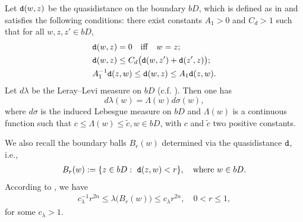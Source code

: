 \documentclass[11pt,a4paper]{amsart}
\numberwithin{equation}{section}
\begin{document}
{Let ${\tt d}(w,z)$ be the quasidistance on the boundary $bD$, which is defined as in \cite[Section 2.3] {LS} and satisfies the following conditions: there exist constants $A_1>0$ and  $C_d>1$ such that for all $w,z,z'\in bD$,
%
\begin{equation}\label{metric d}
\begin{split}
& {\tt d}(w,z)=0\quad {\rm iff}\quad w=z;\\
 & {\tt d}(w,z)\leq C_d\big( {\tt d}(w,z') +{\tt d}(z',z)\big);\\
 &A_1^{-1} {\tt d}(z,w)\leq  {\tt d}(w,z) \leq A_1 {\tt d}(z,w).
\end{split}
\end{equation}
Let $d\lambda$ be the Leray--Levi measure on $bD$ (c.f. \cite[138]{LS}).
\smallskip
Then one has
$$   d\lambda(w)=\Lambda(w)d\sigma(w),
 $$
where  $d\sigma$ is the induced Lebesgue measure on $bD$ and $\Lambda(w)$ is a continuous function such that
$ c\leq \Lambda(w)\leq \tilde c, w\in bD$, with $c$ and $\tilde c$ two positive constants.
\color{black}




We also recall the  boundary balls $ B_r(w) $ determined via the quasidistance ${\tt d }$, i.e.,
\begin{align}\label{ball}
B_r(w) :=\{ z\in bD:\ {\tt d}(z,w)<r \}, \quad {\rm where\ } w\in bD.
\end{align}
According to \cite[p. 139]{LS}, we have
\begin{align}\label{lambdab}
c_\lambda^{-1} r^{2n}\leq \lambda\big(B_r(w) \big)\leq c_\lambda r^{2n},\quad 0<r\leq 1,
\end{align}
for some $c_\lambda>1$.

}
\end{document}
